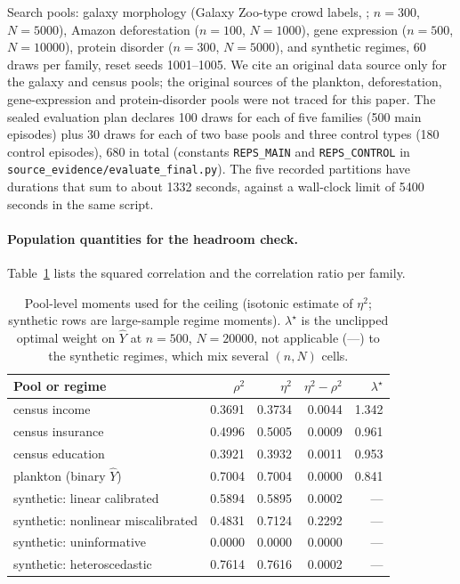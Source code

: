 \documentclass{article}
\newcommand{\Yhat}{\hat Y}
\begin{document}
Search pools: galaxy morphology (Galaxy Zoo-type crowd labels, \citealt{Willett2013GalaxyZ2}; $n=300$, $N=5000$), Amazon deforestation ($n=100$, $N=1000$), gene expression ($n=500$, $N=10000$), protein disorder ($n=300$, $N=5000$), and synthetic regimes, 60 draws per family, reset seeds 1001--1005. We cite an original data source only for the galaxy and census pools; the original sources of the plankton, deforestation, gene-expression and protein-disorder pools were not traced for this paper. The sealed evaluation plan declares 100 draws for each of five families (500 main episodes) plus 30 draws for each of two base pools and three control types (180 control episodes), 680 in total (constants \texttt{REPS\_MAIN} and \texttt{REPS\_CONTROL} in \texttt{source\_evidence/evaluate\_final.py}). The five recorded partitions have durations that sum to about 1332 seconds, against a wall-clock limit of 5400 seconds in the same script. %

\paragraph{Population quantities for the headroom check.} Table~\ref{tab:moments} lists the squared correlation and the correlation ratio per family.

\begin{table}[h]
\centering
\caption{Pool-level moments used for the ceiling (isotonic estimate of $\eta^2$; synthetic rows are large-sample regime moments). $\lambda^\star$ is the unclipped optimal weight on $\Yhat$ at $n=500$, $N=20000$, not applicable (---) to the synthetic regimes, which mix several $(n,N)$ cells.}
\label{tab:moments}
\small
\begin{tabular}{lrrrr}
\toprule
Pool or regime & $\rho^2$ & $\eta^2$ & $\eta^2-\rho^2$ & $\lambda^\star$ \\
\midrule
census income & 0.3691 & 0.3734 & 0.0044 & 1.342 \\
census insurance & 0.4996 & 0.5005 & 0.0009 & 0.961 \\
census education & 0.3921 & 0.3932 & 0.0011 & 0.953 \\
plankton (binary $\Yhat$) & 0.7004 & 0.7004 & 0.0000 & 0.841 \\
synthetic: linear calibrated & 0.5894 & 0.5895 & 0.0002 & --- \\
synthetic: nonlinear miscalibrated & 0.4831 & 0.7124 & 0.2292 & --- \\
synthetic: uninformative & 0.0000 & 0.0000 & 0.0000 & --- \\
synthetic: heteroscedastic & 0.7614 & 0.7616 & 0.0002 & --- \\
\bottomrule
\end{tabular}
\end{table}
\end{document}
